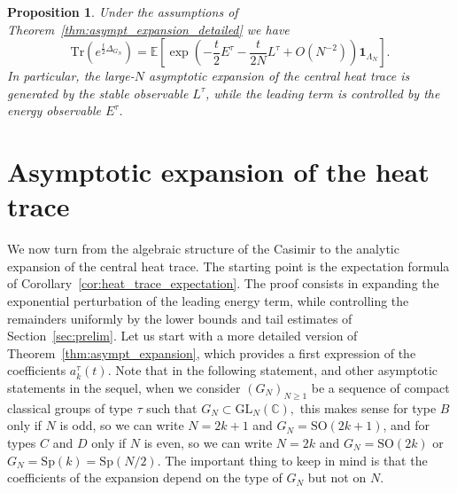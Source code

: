 \documentclass[11pt,a4paper,reqno]{article}
\newtheorem{proposition}[theorem]{Proposition}
\theoremstyle{definition}
\theoremstyle{remark}
\newcommand\SO{{\mathrm{SO}}}
\newcommand\Sp{{\mathrm{Sp}}}
\newcommand\GL{{\mathrm{GL}}}
\newcommand\C{\mathbb{C}}
\newcommand\Tr{\mathrm{Tr}}
\begin{document}
\begin{proposition}\label{prop:heat-shifted}
Under the assumptions of Theorem~\ref{thm:asympt_expansion_detailed} we have
\[
\Tr\left(e^{\frac t2\Delta_{G_N}}\right)=\mathbb E\left[\exp\left(-\frac t2 E^\tau-\frac{t}{2N}L^\tau+O(N^{-2})\right)\mathbf 1_{\Lambda_N}\right].
\]
In particular, the large-$N$ asymptotic expansion of the central heat trace is generated by the
stable observable $L^\tau$, while the leading term is controlled by the energy observable $E^\tau$.
\end{proposition}

\section{Asymptotic expansion of the heat trace}\label{sec:asympt_exp}

We now turn from the algebraic structure of the Casimir to the analytic expansion of the central heat trace. The starting point is the expectation formula of Corollary~\ref{cor:heat_trace_expectation}. The proof consists in expanding the exponential perturbation of the leading energy term, while controlling the remainders uniformly by the lower bounds and tail estimates of Section~\ref{sec:prelim}. Let us start with a more detailed version of Theorem~\ref{thm:asympt_expansion}, which provides a first expression of the coefficients $a_k^\tau (t).$ Note that in the following statement, and other asymptotic statements in the sequel, when we consider $(G_N)_{N \geq 1}$ be a sequence of compact classical groups of type $\tau$ such that $G_N\subset\GL_N(\C),$ this makes sense for type $B$ only if $N$ is odd, so we can write $N=2k+1$ and $G_N=\SO(2k+1)$, and for types $C$ and $D$ only if $N$ is even, so we can write $N=2k$ and $G_N=\SO(2k)$ or $G_N=\Sp(k)=\Sp(N/2)$. The important thing to keep in mind is that the coefficients of the expansion depend on the type of $G_N$ but not on $N$.
\end{document}
